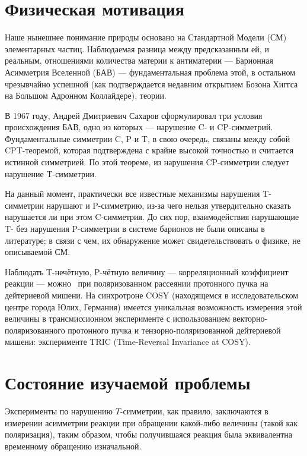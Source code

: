 \documentclass{article}
\begin{document}
	\singlespacing
	
	
	\tableofcontents 
	\pagebreak
	
	\onehalfspacing
	\section*{Физическая мотивация}
	Наше нынешнее понимание природы основано на Стандартной Модели (СМ) элементарных частиц. Наблюдаемая разница между предсказанным ей, и реальным, отношениями количества материи к антиматерии --- Барионная Асимметрия Вселенной (БАВ) --- фундаментальная проблема этой, в остальном чрезывчайно успешной (как подтверждается недавним открытием Бозона Хиггса на Большом Адронном Коллайдере), теории.
	
	В 1967 году, Андрей Дмитриевич Сахаров сформулировал три условия происхождения БАВ, одно из которых --- нарушение C- и CP-симметрий.~\cite{Sakharov} Фундаментальные симметрии C, P и T, в свою очередь, связаны между собой CPT-теоремой, которая подтверждена с крайне высокой точностью и считается истинной симметрией. По этой теореме, из нарушения CP-симметрии следует нарушение T-симметрии.
	
	На данный момент, практически все известные механизмы нарушения T-симметрии нарушают и P-симметрию, из-за чего нельзя утвердительно сказать нарушается ли при этом C-симметрия. До сих пор, взаимодействия нарушающие T- без нарушения P-симметрии в системе барионов не были описаны в литературе; в связи с чем, их обнаружение может свидетельствовать о физике, не описываемой СМ.
	
	Наблюдать T-нечётную, P-чётную величину --- корреляционный коэффициент реакции --- можно~\cite{Conzett} при поляризованном рассеянии протонного пучка на дейтериевой мишени. На синхротроне COSY (находящемся в исследовательском центре города Юлих, Германия) имеется уникальная возможность измерения этой величины в трансмиссионном эксперименте с использованием векторно-поляризованного протонного пучка и тензорно-поляризованной дейтериевой мишени: эксперименте TRIC (Time-Reversal Invariance at COSY).~\cite{Proposal} 
		
	\section{Состояние изучаемой проблемы}
	Эксперименты по нарушению $T$-симметрии, как правило, заключаются в измерении асимметрии реакции при обращении какой-либо величины (такой как поляризация), таким образом, чтобы получившаяся реакция была эквивалентна временному обращению изначальной.
	
\end{document}
